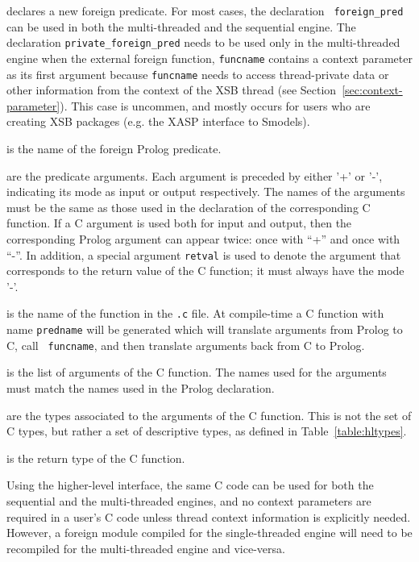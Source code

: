 \begin{description}

 declares a new
foreign predicate.  For most cases, the declaration {\tt
  foreign\_pred} can be used in both the multi-threaded and the
sequential engine.  The declaration {\tt private\_foreign\_pred} needs
to be used only in the multi-threaded engine when the external foreign
function, {\tt funcname} contains a context parameter as its first
argument because {\tt funcname} needs to access thread-private data or
other information from the context of the XSB thread (see
Section~\ref{sec:context-parameter}).  This case is uncommen, and
mostly occurs for users who are creating XSB packages (e.g. the XASP
interface to Smodels).

 is the name of the foreign Prolog predicate. 

 are the predicate arguments. Each argument
is preceded by either '+' or '-', indicating its mode as input or
output respectively. The names of the arguments must be the same as
those used in the declaration of the corresponding C function. If a C
argument is used both for input and output, then the corresponding
Prolog argument can appear twice: once with ``+'' and once with ``-''.
In addition, a special argument \texttt{retval} is used to denote the
argument that corresponds to the return value of the C function; it
must always have the mode '-'.

 is the name of the function in the {\tt .c} file.
At compile-time a C function with name {\tt predname} will be
generated which will translate arguments from Prolog to C, call {\tt
  funcname}, and then translate arguments back from C to Prolog.

 is the list of arguments of the C
function. The names used for the arguments must match the names used
in the Prolog declaration.

 are the types associated to the arguments of
the C function. This is not the set of C types, but rather a set of
descriptive types, as defined in Table~\ref{table:hltypes}.

 is the return type of the C function.

\end{description}

Using the higher-level interface, the same C code can be used for both
the sequential and the multi-threaded engines, and no context
parameters are required in a user's C code unless thread context
information is explicitly needed.  However, a foreign module compiled
for the single-threaded engine will need to be recompiled for the
multi-threaded engine and vice-versa.


